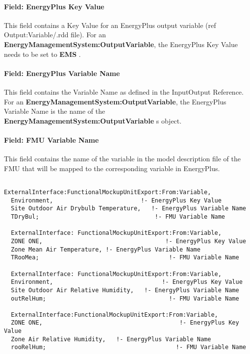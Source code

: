 \paragraph{Field: EnergyPlus Key Value}\label{field-energyplus-key-value-1}

This field contains a Key Value for an EnergyPlus output variable (ref Output:Variable/.rdd file). For an \textbf{EnergyManagementSystem:OutputVariable}, the EnergyPlus Key Value needs to be set to \textbf{EMS} .

\paragraph{Field: EnergyPlus Variable Name}\label{field-energyplus-variable-name-4}

This field contains the Variable Name as defined in the InputOutput Reference. For an \textbf{EnergyManagementSystem:OutputVariable}, the EnergyPlus Variable Name is the name of the \textbf{EnergyManagementSystem:OutputVariable} s object.

\paragraph{Field: FMU Variable Name}\label{field-fmu-variable-name-4}

This field contains the name of the variable in the model description file of the FMU that will be mapped to the corresponding variable in EnergyPlus.

\begin{lstlisting}

ExternalInterface:FunctionalMockupUnitExport:From:Variable,
  Environment,                         !- EnergyPlus Key Value
  Site Outdoor Air Drybulb Temperature,   !- EnergyPlus Variable Name
  TDryBul;                                 !- FMU Variable Name

  ExternalInterface: FunctionalMockupUnitExport:From:Variable,
  ZONE ONE,                                   !- EnergyPlus Key Value
  Zone Mean Air Temperature, !- EnergyPlus Variable Name
  TRooMea;                                     !- FMU Variable Name

  ExternalInterface: FunctionalMockupUnitExport:From:Variable,
  Environment,                               !- EnergyPlus Key Value
  Site Outdoor Air Relative Humidity,   !- EnergyPlus Variable Name
  outRelHum;                                   !- FMU Variable Name

  ExternalInterface:FunctionalMockupUnitExport:From:Variable,
  ZONE ONE,                                       !- EnergyPlus Key Value
  Zone Air Relative Humidity,   !- EnergyPlus Variable Name
  rooRelHum;                                     !- FMU Variable Name
\end{lstlisting}

